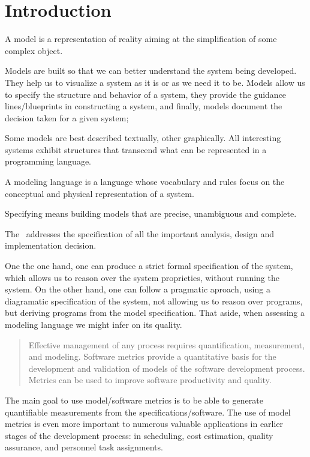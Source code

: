 \section{Introduction}

\indent
\par A model is a representation of reality aiming at the simplification of some complex object.

\par Models are built so that we can better understand the system being developed.
They help us to visualize a system as it is or as we need it to be. Models allow us to specify the structure and behavior of a system, they provide the guidance lines/blueprints in constructing a system, and finally, models document the decision taken for a given system;


\par Some models are best described textually, other graphically. All interesting systems exhibit structures that transcend what can be represented in a programming language.


\par A modeling language is a language whose vocabulary and rules focus on the conceptual and physical representation of a system.%

\par Specifying means building models that are precise, unambiguous and complete. 

The \umlS~addresses the specification of all the important analysis, design and implementation decision. %

\par One the one hand, one can produce a strict formal specification of the system, which allows us to reason over the system proprieties, without running the system.
On the other hand, one can follow a pragmatic aproach, using a diagramatic specification of the system, not allowing us to reason over programs,
but deriving programs from the model specification. That aside, when assessing a modeling language we might infer on its quality.
\begin{quotation}
Effective management of any process requires quantification, measurement, and modeling.
Software metrics provide a quantitative basis for the development and validation of models of the software development process.
Metrics can be used to improve software productivity and quality\cite{g1:Millis:1998}.
\end{quotation}

The main goal to use model/software metrics is to be able to generate quantifiable measurements from the specifications/software. The use of model metrics is even more
important to numerous valuable applications in earlier stages of the development process: in scheduling, cost estimation, quality assurance, and personnel task assignments.


